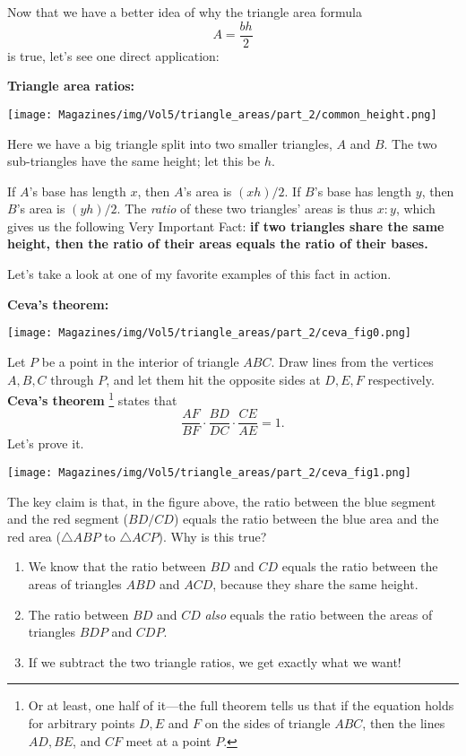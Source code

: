 \documentclass{article}
\begin{document}
\begin{multicols}{3}
Now that we have a better idea of why the triangle area formula
\[ A = \frac{bh}{2} \]
is true, let's see one direct application:

\textbf{Triangle area ratios:}

\begin{center}
    \centering
    \texttt{[image: Magazines/img/Vol5/triangle\_areas/part\_2/common\_height.png]}
\end{center}

Here we have a big triangle split into two smaller triangles, $A$ and $B$. The two sub-triangles have the same height; let this be $h$.

If $A$'s base has length $x$, then $A$'s area is $(xh)/2$. If $B$'s base has length $y$, then $B$'s area is $(yh)/2$. The \textit{ratio} of these two triangles' areas is thus $x : y$, which gives us the following Very Important Fact: \textbf{if two triangles share the same height, then the ratio of their areas equals the ratio of their bases.}

Let's take a look at one of my favorite examples of this fact in action.

\textbf{Ceva's theorem:}

\begin{center}
    \centering
    \texttt{[image: Magazines/img/Vol5/triangle\_areas/part\_2/ceva\_fig0.png]}
\end{center}

Let $P$ be a point in the interior of triangle $ABC$. Draw lines from the vertices $A, B, C$ through $P$, and let them hit the opposite sides at $D, E, F$ respectively. \textbf{Ceva's theorem} \footnote{Or at least, one half of it—the full theorem tells us that if the equation holds for arbitrary points $D, E$ and $F$ on the sides of triangle $ABC$, then the lines $AD, BE$, and $CF$ meet at a point $P$.} states that
$$\dfrac{AF}{BF} \cdot \dfrac{BD}{DC} \cdot \dfrac{CE}{AE} = 1.$$
Let's prove it.
\begin{center}
    \centering
    \texttt{[image: Magazines/img/Vol5/triangle\_areas/part\_2/ceva\_fig1.png]}
\end{center}
The key claim is that, in the figure above, the ratio between the blue segment and the red segment ($BD/CD$) equals the ratio between the blue area and the red area ($\triangle ABP$ to $\triangle ACP$). Why is this true?
\begin{enumerate}
    \item We know that the ratio between $BD$ and $CD$ equals the ratio between the areas of triangles $ABD$ and $ACD$, because they share the same height.
    \item The ratio between $BD$ and $CD$ \textit{also} equals the ratio between the areas of triangles $BDP$ and $CDP$.
    \item If we subtract the two triangle ratios, we get exactly what we want!
\end{enumerate}


\end{multicols}
\end{document}
